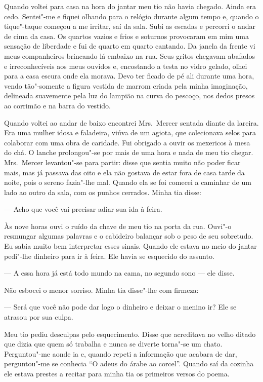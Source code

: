 Quando voltei para casa na hora do jantar meu tio não havia chegado.  Ainda era
cedo.  Sentei"-me e fiquei olhando para o relógio durante algum tempo e, quando
o tique"-taque começou a me irritar, saí da sala.  Subi as escadas e percorri o
andar de cima da casa.  Os quartos vazios e frios e soturnos provocaram em mim
uma sensação de liberdade e fui de quarto em quarto cantando.  Da janela da
frente vi meus companheiros brincando lá embaixo na rua.  Seus gritos chegavam
abafados e irreconhecíveis aos meus ouvidos e, encostando a testa no vidro
gelado, olhei para a casa escura onde ela morava.  Devo ter ficado de pé ali
durante uma hora, vendo tão"-somente a figura vestida de marrom criada pela
minha imaginação, delineada suavemente pela luz do lampião na curva do pescoço,
nos dedos presos ao corrimão e na barra do vestido.

Quando voltei ao andar de baixo encontrei Mrs.~Mercer sentada diante da
lareira.  Era uma mulher idosa e faladeira, viúva de um agiota, que colecionava
selos para colaborar com uma obra de caridade.  Fui obrigado a ouvir os
mexericos à mesa do chá.  O lanche prolongou"-se por mais de uma hora e nada de
meu tio chegar.  Mrs.~Mercer levantou"-se para partir: disse que sentia muito
não poder ficar mais, mas já passava das oito e ela não gostava de estar fora
de casa tarde da noite, pois o sereno fazia"-lhe mal.  Quando ela se foi comecei
a caminhar de um lado ao outro da sala, com os punhos cerrados.  Minha tia
disse:

--- Acho que você vai precisar adiar sua ida à feira.

Às nove horas ouvi o ruído da chave de meu tio na porta da rua.  Ouvi"-o
resmungar algumas palavras e o cabideiro balançar sob o peso de seu sobretudo.
Eu sabia muito bem interpretar esses sinais.  Quando ele estava no meio do
jantar pedi"-lhe dinheiro para ir à feira.  Ele havia se esquecido do assunto.

--- A essa hora já está todo mundo na cama, no segundo sono --- ele disse.

Não esbocei o menor sorriso.  Minha tia disse"-lhe com firmeza:

--- Será que você não pode dar logo o dinheiro e deixar o menino ir?  Ele se
atrasou por sua culpa.

Meu tio pediu desculpas pelo esquecimento.  Disse que acreditava no velho
ditado que dizia que quem só trabalha e nunca se diverte torna"-se um chato.
Perguntou"-me aonde ia e, quando repeti a informação que acabara de dar,
perguntou"-me se conhecia “O adeus do árabe ao corcel”.  Quando saí da cozinha
ele estava prestes a recitar para minha tia os primeiros versos do poema.

